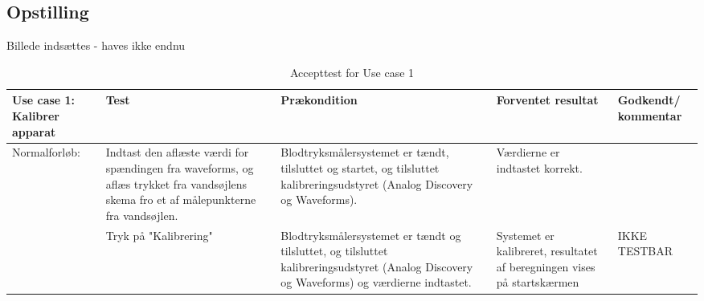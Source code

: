 \subsection{Opstilling}
Billede indsættes - haves ikke endnu

\begin{table}[H]
\caption{Accepttest for Use case 1}\label{tab:tabel8}
\begin{tabular}{|>{\raggedright\arraybackslash}p{2.5cm}| >{\raggedright\arraybackslash}p{2.9cm} | >{\raggedright\arraybackslash}p{2.9cm} | >{\raggedright\arraybackslash}p{2.9cm} | >{\raggedright\arraybackslash}p{2.8cm} |}
   \hline
   \textbf{Use case 1: Kalibrer apparat} &\textbf{Test}& \textbf{Prækondition} & \textbf{Forventet resultat} & \textbf{Godkendt/ kommentar}\\ \hline
   Normalforløb: & Indtast den aflæste værdi for spændingen fra waveforms, og aflæs trykket fra vandsøjlens skema fro et af målepunkterne fra vandsøjlen. & Blodtryksmålersystemet er tændt, tilsluttet og startet, og tilsluttet kalibreringsudstyret (Analog Discovery og Waveforms). & Værdierne er indtastet korrekt. & \\\hline
   & Tryk på "Kalibrering" & Blodtryksmålersystemet er tændt og tilsluttet, og tilsluttet kalibreringsudstyret (Analog Discovery og Waveforms) og værdierne indtastet. & Systemet er kalibreret, resultatet af beregningen vises på startskærmen & IKKE TESTBAR\\\hline
\end{tabular}
\end{table}



